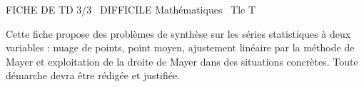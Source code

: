 \documentclass[11pt]{article}
\begin{document}
\begin{tcolorbox}[enhanced,colback=popink,colframe=popink,arc=10pt,boxrule=0pt,left=12pt,right=12pt,top=9pt,bottom=9pt]
{\color{white}\popxbold\small FICHE DE TD 3/3 \textbullet\ DIFFICILE \hfill Mathématiques \textbullet\ Tle T\par}
\end{tcolorbox}
\vspace{4pt}
Cette fiche propose des problèmes de synthèse sur les séries statistiques à deux variables : nuage de points, point moyen, ajustement linéaire par la méthode de Mayer et exploitation de la droite de Mayer dans des situations concrètes. Toute démarche devra être rédigée et justifiée.
\end{document}
